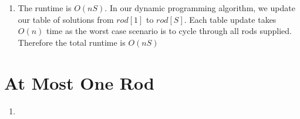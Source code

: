 \documentclass{article}
\begin{document}
\begin{enumerate}
\begin{algorithmic}
            \EndFunction        
        \end{algorithmic}

    \item The runtime is $O(nS)$. In our dynamic programming algorithm, we update our table of solutions from $rod[1]$ to $rod[S]$.
            Each table update takes $O(n)$ time as the worst case scenario is to cycle through all rods supplied. Therefore the total runtime is $O(nS)$
\end{enumerate}

\newpage
\section{At Most One Rod}
\begin{enumerate}
    \item 
\end{enumerate}
\end{document}
